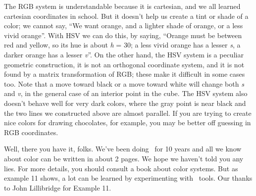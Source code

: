 The RGB system is understandable because it is cartesian, and we all
learned cartesian coordinates in school.  But it doesn't help us
create a tint or shade of a color; we cannot say, ``We want orange,
and a lighter shade of orange, or a less vivid orange''.  With HSV we
can do this, by saying, ``Orange must be between red and yellow, so
its hue is about {\it h} = 30; a less vivid orange has a lesser
{\it s}, a darker orange has a lesser {\it v}''.  On the other hand,
the HSV system is a peculiar geometric construction, it is not an
orthogonal coordinate system, and it is not found by a matrix
transformation of RGB; these make it difficult in some cases too.
Note that a move toward black or a move toward white will change both
{\it s} and {\it v}, in the general case of an interior point in the
cube. The HSV system also doesn't behave well for very dark colors,
where the gray point is near black and the two lines we constructed
above are almost parallel.  If you are trying to create nice colors
for drawing chocolates, for example, you may be better off guessing
in RGB coordinates.

Well, there you have it, folks.  We've been doing \GMT\ for 10 years
and all we know about color can be written in about 2 pages.  We
hope we haven't told you any lies.  For more details, you should
consult a book about color systems.  But as example 11 shows, a lot
can be learned by experimenting with \GMT\ tools.  Our thanks to John
Lillibridge for Example 11.

